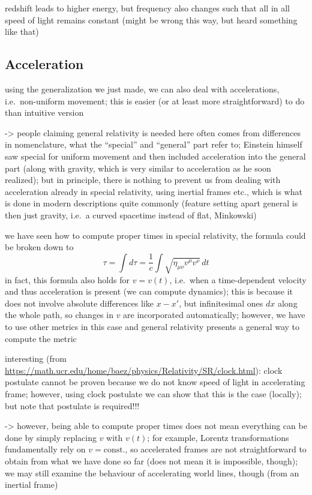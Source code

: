 redshift leads to higher energy, but frequency also changes such that all in all speed of light remains constant (might be wrong this way, but heard something like that)




		\subsection{Acceleration}%
using the generalization we just made, we can also deal with accelerations, i.e.~non-uniform movement; this is easier (or at least more straightforward) to do than intuitive version


-> people claiming general relativity is needed here often comes from differences in nomenclature, what the \enquote{special} and \enquote{general} part refer to; Einstein himself saw special for uniform movement and then included acceleration into the general part (along with gravity, which is very similar to acceleration as he soon realized); but in principle, there is nothing to prevent us from dealing with acceleration already in special relativity, using inertial frames etc., which is what is done in modern descriptions quite commonly (feature setting apart general is then just gravity, i.e.~a curved spacetime instead of flat, Minkowski)



we have seen how to compute proper times in special relativity, the formula could be broken down to 
\begin{equation*}
	\tau = \int d\tau = \frac{1}{c} \int \sqrt{\eta_{\mu \nu} v^\mu v^\nu} \, dt
\end{equation*}
in fact, this formula also holds for $v = v(t)$, i.e.~when a time-dependent velocity and thus acceleration is present (we can compute dynamics); this is because it does not involve absolute differences like $x - x'$, but infinitesimal ones $dx$ along the whole path, so changes in $v$ are incorporated automatically; however, we have to use other metrics in this case and general relativity presents a general way to compute the metric


interesting (from \url{https://math.ucr.edu/home/baez/physics/Relativity/SR/clock.html}): clock postulate cannot be proven because we do not know speed of light in accelerating frame; however, using clock postulate we can show that this is the case (locally); but note that postulate is required!!!


-> however, being able to compute proper times does not mean everything can be done by simply replacing $v$ with $v(t)$; for example, Lorentz transformations fundamentally rely on $v = \text{const.}$, so accelerated frames are not straightforward to obtain from what we have done so far (does not mean it is impossible, though); we may still examine the behaviour of accelerating world lines, though (from an inertial frame)




